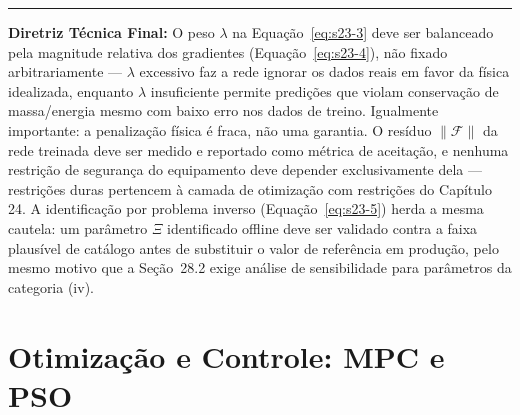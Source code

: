 \documentclass[12pt,a4paper]{article}
\numberwithin{equation}{section}
\numberwithin{table}{section}
\numberwithin{figure}{section}
\begin{document}
	\vspace{1em}
	\hrule
	\vspace{1em}

	\textbf{Diretriz Técnica Final:} O peso $\lambda$ na Equação~\eqref{eq:s23-3} deve ser balanceado pela magnitude relativa dos gradientes (Equação~\eqref{eq:s23-4}), não fixado arbitrariamente — $\lambda$ excessivo faz a rede ignorar os dados reais em favor da física idealizada, enquanto $\lambda$ insuficiente permite predições que violam conservação de massa/energia mesmo com baixo erro nos dados de treino. Igualmente importante: a penalização física é fraca, não uma garantia. O resíduo $\| \mathcal{F} \|$ da rede treinada deve ser medido e reportado como métrica de aceitação, e nenhuma restrição de segurança do equipamento deve depender exclusivamente dela — restrições duras pertencem à camada de otimização com restrições do Capítulo 24. A identificação por problema inverso (Equação~\eqref{eq:s23-5}) herda a mesma cautela: um parâmetro $\Xi$ identificado offline deve ser validado contra a faixa plausível de catálogo antes de substituir o valor de referência em produção, pelo mesmo motivo que a Seção~28.2 exige análise de sensibilidade para parâmetros da categoria (iv).

	\clearpage
	\section{Otimização e Controle: MPC e PSO}

\end{document}
